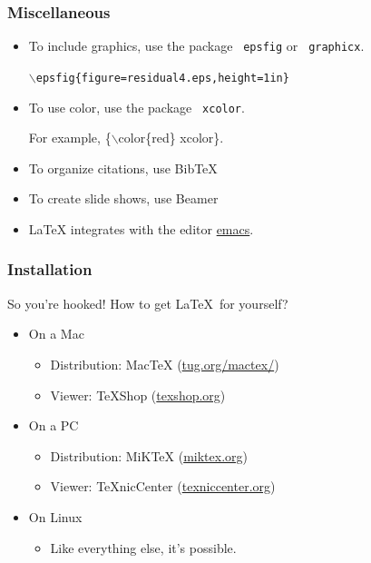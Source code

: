 \documentclass{beamer}  %
\begin{document}
\frame
{
\frametitle{Miscellaneous}

\begin{itemize}

\item To include graphics, use the package  {\tt \color{red} epsfig} or {\tt \color{red} graphicx}.

\par {\tt $\backslash$epsfig\{figure=residual4.eps,height=1in\}}

\begin{center}
\end{center}

\item To use color, use the package {\tt \color{red} xcolor}.

For example, \{$\backslash$color\{red\} xcolor\}.

\end{itemize}

\begin{itemize}
\item To organize citations, use Bib\TeX\  
\item To create slide shows, use Beamer
\item LaTeX integrates with the editor \url{emacs}.
\end{itemize}

}

\frame
{
\frametitle{Installation}

So you're hooked!  How to get \LaTeX\ for yourself?

\begin{itemize}
\item  On a Mac
   \begin{itemize}
   \item  Distribution: MacTeX (\url{tug.org/mactex/})
   \item  Viewer: TeXShop (\url{texshop.org})
   \end{itemize}
\item  On a PC
   \begin{itemize}
   \item  Distribution: MiKTeX (\url{miktex.org})
   \item  Viewer: TeXnicCenter (\url{texniccenter.org})
   \end{itemize}
\item  On Linux
   \begin{itemize}
   \item  Like everything else, it's possible.
   \end{itemize}
\end{itemize}

}
\end{document}
